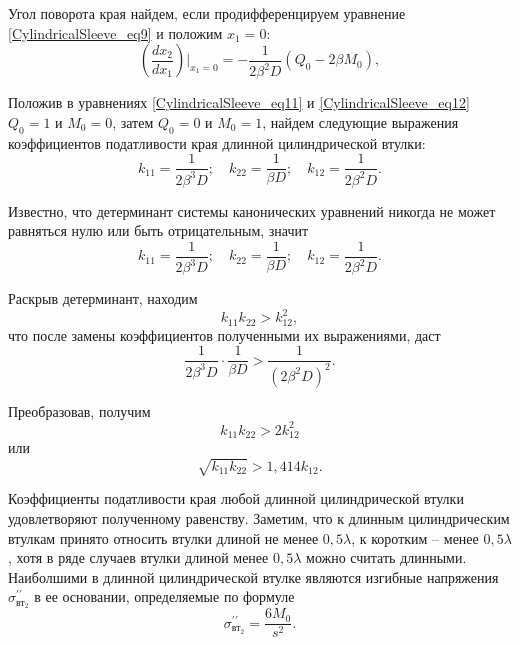 Угол поворота края найдем, если продифференцируем уравнение \eqref{CylindricalSleeve_eq9} и положим $x_1=0$:
\begin{equation}
  \label{CylindricalSleeve_eq12}
  \left(\frac{d x_2}{d x_1}\right) \bigg|_{x_1=0}= -\frac{1}{2 {\beta}^2 D} \left( Q_0 -2 \beta M_0 \right),  
\end{equation}

Положив в уравнениях \eqref{CylindricalSleeve_eq11} и \eqref{CylindricalSleeve_eq12} $Q_0=1$ и $M_0=0$, затем $Q_0=0$ и $M_0=1$, найдем следующие выражения коэффициентов податливости края длинной цилиндрической втулки:
\begin{equation}
  \label{CylindricalSleeve_eq13}
  k_{11}=\frac{1}{2 {\beta}^3 D}; \quad k_{22}=\frac{1}{\beta D};\quad k_{12}=\frac{1}{2 {\beta}^2 D}.  
\end{equation}

Известно, что детерминант системы канонических уравнений никогда не может равняться нулю или быть отрицательным, значит 
\begin{equation}
  \label{CylindricalSleeve_eq14}
  k_{11}=\frac{1}{2 {\beta}^3 D}; \quad k_{22}=\frac{1}{\beta D};\quad k_{12}=\frac{1}{2 {\beta}^2 D}.  
\end{equation}

Раскрыв детерминант, находим
\begin{equation}
  \label{CylindricalSleeve_eq15}
  k_{11}k_{22} > k_{12}^2,  
\end{equation}
что после замены коэффициентов полученными их выражениями, даст 
\begin{equation}
  \label{CylindricalSleeve_eq16}
  \frac{1}{2 {\beta}^3 D} \cdot \frac{1}{\beta D} > \frac{1}{\left( 2 {\beta}^2 D \right)^2}.  
\end{equation}

Преобразовав, получим 
\begin{equation*}
  k_{11}k_{22} > 2k_{12}^2  
\end{equation*}
или 
\begin{equation}
  \label{CylindricalSleeve_eq17}
  \sqrt{k_{11}k_{22}} > 1,414k_{12}.  
\end{equation}


Коэффициенты податливости края любой длинной цилиндрической втулки удовлетворяют полученному равенству.
Заметим, что к длинным цилиндрическим втулкам принято относить втулки длиной не менее $0,5 \lambda$, к коротким -- менее $0,5 \lambda$, хотя в ряде случаев втулки длиной менее $0,5 \lambda$ можно считать длинными.
Наиболшими в длинной цилиндрической втулке являются изгибные напряжения ${\sigma}_{{\text{вт}}_2}^{\prime \prime}$ в ее основании, определяемые по формуле 
\begin{equation}
  \label{CylindricalSleeve_eq18}
  {\sigma}_{{\text{вт}}_2}^{\prime \prime}=\frac{6M_0}{s^2}.  
\end{equation}



